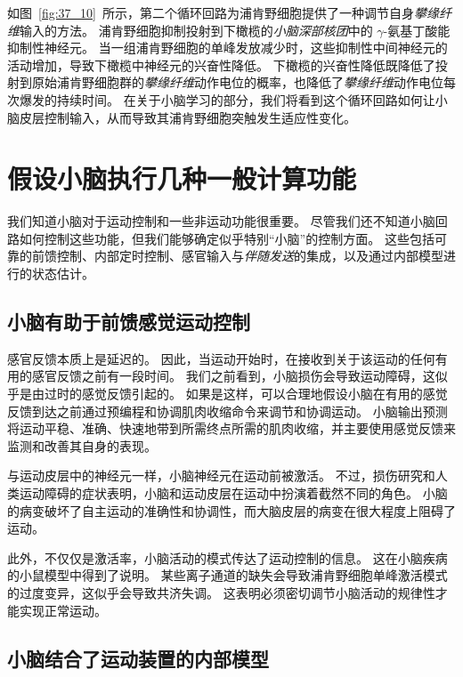如图~\ref{fig:37_10}~所示，第二个循环回路为浦肯野细胞提供了一种调节自身\textit{攀缘纤维}输入的方法。
浦肯野细胞抑制投射到下橄榄的\textit{小脑深部核团}中的 $\gamma$-氨基丁酸能抑制性神经元。
当一组浦肯野细胞的单峰发放减少时，这些抑制性中间神经元的活动增加，导致下橄榄中神经元的兴奋性降低。
下橄榄的兴奋性降低既降低了投射到原始浦肯野细胞群的\textit{攀缘纤维}动作电位的概率，也降低了\textit{攀缘纤维}动作电位每次爆发的持续时间。
在关于小脑学习的部分，我们将看到这个循环回路如何让小脑皮层控制输入，从而导致其浦肯野细胞突触发生适应性变化。




\section{假设小脑执行几种一般计算功能}

我们知道小脑对于运动控制和一些非运动功能很重要。
尽管我们还不知道小脑回路如何控制这些功能，但我们能够确定似乎特别“小脑”的控制方面。
这些包括可靠的前馈控制、内部定时控制、感官输入与\textit{伴随发送}的集成，以及通过内部模型进行的状态估计。



\subsection{小脑有助于前馈感觉运动控制}

感官反馈本质上是延迟的。
因此，当运动开始时，在接收到关于该运动的任何有用的感官反馈之前有一段时间。
我们之前看到，小脑损伤会导致运动障碍，这似乎是由过时的感觉反馈引起的。
如果是这样，可以合理地假设小脑在有用的感觉反馈到达之前通过预编程和协调肌肉收缩命令来调节和协调运动。
小脑输出预测将运动平稳、准确、快速地带到所需终点所需的肌肉收缩，并主要使用感觉反馈来监测和改善其自身的表现。


与运动皮层中的神经元一样，小脑神经元在运动前被激活。
不过，损伤研究和人类运动障碍的症状表明，小脑和运动皮层在运动中扮演着截然不同的角色。
小脑的病变破坏了自主运动的准确性和协调性，而大脑皮层的病变在很大程度上阻碍了运动。


此外，不仅仅是激活率，小脑活动的模式传达了运动控制的信息。
这在小脑疾病的小鼠模型中得到了说明。
某些离子通道的缺失会导致浦肯野细胞单峰激活模式的过度变异，这似乎会导致共济失调。
这表明必须密切调节小脑活动的规律性才能实现正常运动。



\subsection{小脑结合了运动装置的内部模型}

